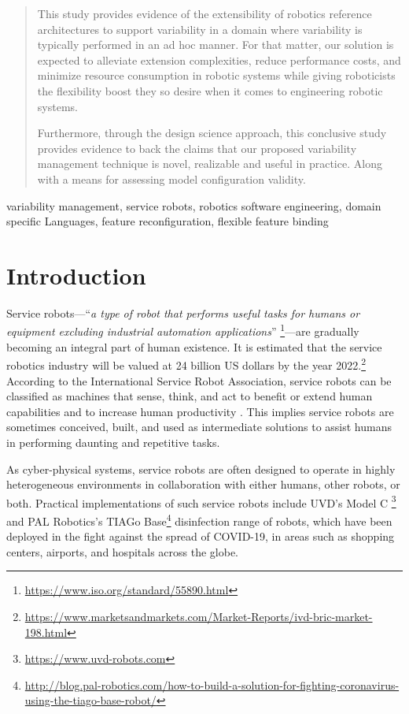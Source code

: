 \documentclass[conference]{IEEEtran}
\newcommand{\foot}[1]{\footnote{\url{#1}}}
\begin{document}
\begin{abstract}
This study provides evidence of the extensibility of robotics reference architectures to support variability in a domain where variability is typically performed in an ad hoc manner. For that matter, our solution is expected to alleviate extension complexities, reduce performance costs, and minimize resource consumption in robotic systems while giving roboticists the flexibility boost they so desire when it comes to engineering robotic systems.

Furthermore, through the design science approach, this conclusive study provides evidence to back the claims that our proposed variability management technique is novel, realizable and useful in practice. Along with a means for assessing model configuration validity.
\end{abstract}

\begin{IEEEkeywords}
variability management, service robots, robotics software engineering, domain specific Languages, feature reconfiguration, flexible feature binding
\end{IEEEkeywords}

\section{Introduction}
\label{section:intro}
Service robots---``{\em a type of robot that performs useful tasks for humans or equipment excluding industrial automation applications}'' \foot{https://www.iso.org/standard/55890.html}---are gradually becoming an integral part of human existence. It is estimated that the service robotics industry will be valued at 24 billion US dollars by the year 2022.\foot{https://www.marketsandmarkets.com/Market-Reports/ivd-bric-market-198.html}
According to the International Service Robot Association, service robots can be classified as machines that sense, think, and act to benefit or extend human capabilities and to increase human productivity \cite{serv-rob-his}. This implies service robots are sometimes conceived, built, and used as intermediate solutions to assist humans in performing daunting and repetitive tasks.

As cyber-physical systems, service robots are often designed to operate in highly heterogeneous environments in collaboration with either humans, other robots, or both. Practical implementations of such service robots include UVD's Model C \foot{https://www.uvd-robots.com} and PAL Robotics's TIAGo Base\foot{http://blog.pal-robotics.com/how-to-build-a-solution-for-fighting-coronavirus-using-the-tiago-base-robot/} 
disinfection range of robots, which have been deployed in the fight against the spread of COVID-19, in areas such as shopping centers, airports, and hospitals across the globe.
\end{document}
